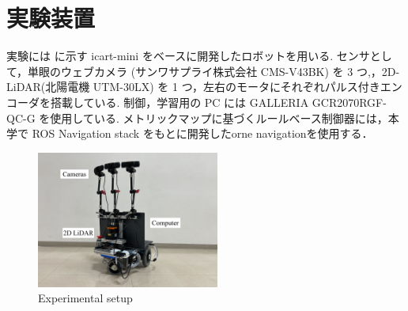 \section{実験装置}
実験には  に示す icart-mini\cite{icart} をベースに開発したロボットを用いる.
センサとして，単眼のウェブカメラ (サンワサプライ株式会社 CMS-V43BK) を 3 つ,，2D-LiDAR(北陽電機 UTM-30LX) を 1 つ，左右のモータにそれぞれパルス付きエンコーダを搭載している.
制御，学習用の PC には GALLERIA GCR2070RGF-QC-G を使用している.
メトリックマップに基づくルールベース制御器には，本学で ROS Navigation stack をもとに開発したorne navigation\cite{orne_nav}を使用する．

\begin{figure}[htbp]
    \centering
     \includegraphics[width=60mm]{images/pdf/ishiguro/gamma.pdf}
     \caption{Experimental setup}
     \label{fig:gamma}
\end{figure}